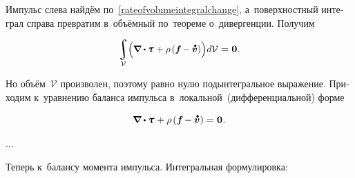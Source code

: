 \begin{otherlanguage}{russian}
\noindent
Импульс слева найдём по~\eqref{rateofvolumeintegralchange}, а~поверхностный интеграл справа превратим в~объёмный по~теореме о~дивергенции. Получим

\nopagebreak\vspace{-0.1em}\begin{equation*}
\scalebox{0.96}[0.96]{$\displaystyle\integral\displaylimits_{\mathcal{V}} \hspace{-0.5ex} \left(^{\mathstrut} \hspace{-0.16ex} \boldnabla \dotp \cauchystress \hspace{0.15ex}
+ \rho \hspace{-0.1ex} \left( \bm{f} \hspace{-0.2ex} - \mathdotabove{\bm{v}} \right) \right) \hspace{-0.33ex} d\mathcal{V}$} \hspace{.1ex}
= \hspace{.1ex} \bm{0}
\hspace{.1ex} .
\end{equation*}

\vspace{-0.25em}\noindent
Но объём~$\mathcal{V}$ произволен, поэтому равно нулю подынтегральное выражение.
Приходим к~уравнению баланса импульса в~локальной~(дифференциальной) форме

\nopagebreak\vspace{-0.1em}\begin{equation}\label{balanceoftranslationalmomentum.local}
\boldnabla \dotp \cauchystress \hspace{.15ex}
+ \rho \hspace{-0.1ex} \left( \bm{f} \hspace{-0.2ex} - \mathdotabove{\bm{v}} \right)
= \hspace{.1ex} \bm{0}
\hspace{.1ex} .
\end{equation}

...

Теперь к~балансу момента импульса.
Интегральная формулировка:


\end{otherlanguage}

